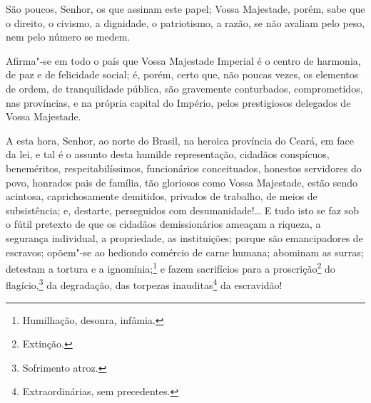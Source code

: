 São poucos, Senhor, os que assinam este papel; Vossa Majestade, porém,
sabe que o direito, o civismo, a dignidade, o patriotismo, a razão, se
não avaliam pelo peso, nem pelo número se medem.


Afirma"-se em todo o país que Vossa Majestade Imperial é o centro de
harmonia, de paz e de felicidade social; é, porém, certo que, não poucas
vezes, os elementos de ordem, de tranquilidade pública, são gravemente
conturbados, comprometidos, nas províncias, e na própria capital do
Império, pelos prestigiosos delegados de Vossa Majestade.

A esta hora, Senhor, ao norte do Brasil, na heroica província do Ceará,
em face da lei, e tal é o assunto desta humilde representação, cidadãos
conspícuos, beneméritos, respeitabilíssimos, funcionários conceituados,
honestos servidores do povo, honrados pais de família, tão gloriosos
como Vossa Majestade, estão sendo acintosa, caprichosamente demitidos,
privados de trabalho, de meios de subsistência; e, destarte, perseguidos
com desumanidade!\ldots{} E tudo isto se faz sob o fútil pretexto de que os
cidadãos demissionários ameaçam a riqueza, a segurança individual, a
propriedade, as instituições; porque são emancipadores de escravos;
opõem"-se ao hediondo comércio de carne humana; abominam as surras;
detestam a tortura e a ignomínia;\footnote{Humilhação, desonra,
  infâmia.} e fazem sacrifícios para a proscrição\footnote{Extinção.}
do flagício,\footnote{Sofrimento atroz.} da degradação, das torpezas
inauditas\footnote{Extraordinárias, sem precedentes.} da escravidão!


